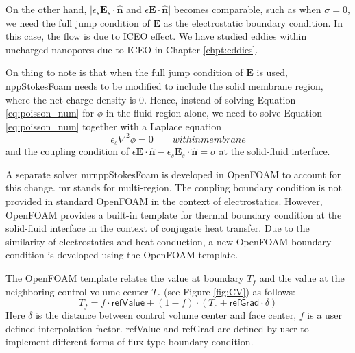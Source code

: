 On the other hand, $|\epsilon_{s} \mathbf{E}_{s} \cdot \hat{\mathbf{n}}$ and $\epsilon \mathbf{E} \cdot  \hat{\mathbf{n}}|$ becomes comparable, such as when $\sigma = 0$, we need the full jump condition of $\mathbf{E}$ as the electrostatic boundary condition. In this case, the flow is due to ICEO effect. We have studied eddies within uncharged nanopores due to ICEO in Chapter \ref{chpt:eddies}. 

On thing to note is that when the full jump condition of $\mathbf{E}$ is used, \textsf{nppStokesFoam} needs to be modified to include the solid membrane region, where the net charge density is 0. Hence, instead of solving Equation \ref{eq:poisson_num} for $\phi$ in the fluid region alone, we need to solve Equation \ref{eq:poisson_num} together with a Laplace equation
\begin{equation}
\epsilon_s \nabla^2 \phi = 0 \qquad within membrane
\label{eq:laplace_num}
\end{equation}
and the coupling condition of $\epsilon \mathbf{E} \cdot  \hat{\mathbf{n}} - \epsilon_{s} \mathbf{E}_{s} \cdot \hat{\mathbf{n}} = \sigma$ at the solid-fluid interface. 

A separate solver \textsf{mrnppStokesFoam} is developed in OpenFOAM to account for this change. \textsf{mr} stands for multi-region. The coupling boundary condition is not provided in standard OpenFOAM in the context of electrostatics. However, OpenFOAM provides a built-in template for thermal boundary condition at the solid-fluid interface in the context of conjugate heat transfer. Due to the similarity of electrostatics and heat conduction, a new OpenFOAM boundary condition is developed using the OpenFOAM template.

The OpenFOAM template relates the value at boundary $T_f$ and the value at the neighboring control volume center $T_c$ (see Figure \ref{fig:CV}) as follows:
\begin{equation}
T_f = f\cdot \mathsf{refValue} + (1-f)\cdot(T_c + \mathsf{refGrad}\cdot\delta)
\label{eq:OF_BC}
\end{equation}
Here $\delta$ is the distance between control volume center and face center, $f$ is a user defined interpolation factor. \textsf{refValue} and \textsf{refGrad} are defined by user to implement different forms of flux-type boundary condition.

